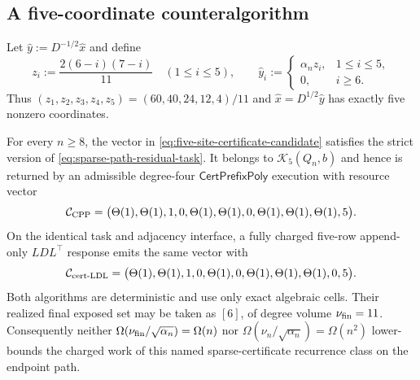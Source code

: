 \subsection{A five-coordinate counteralgorithm}

Let $\widehat y:=D^{-1/2}\widehat x$ and define
\begin{equation}
 z_i:=\frac{2(6-i)(7-i)}{11}
 \quad(1\leq i\leq5),
 \qquad
 \widehat y_i:=
 \begin{cases}
  \alpha_n z_i,&1\leq i\leq5,\\
  0,&i\geq6.
 \end{cases}
 \label{eq:five-site-certificate-candidate}
\end{equation}
Thus
$(z_1,z_2,z_3,z_4,z_5)=(60,40,24,12,4)/11$ and
$\widehat x=D^{1/2}\widehat y$ has exactly five nonzero coordinates.

\begin{theorem}
\label{thm:five-site-supported-prefix-counteralgorithm}
For every $n\geq8$, the vector in
\cref{eq:five-site-certificate-candidate} satisfies the strict version of
\cref{eq:sparse-path-residual-task}.  It belongs to
$\mathcal K_5(Q_n,b)$ and hence is returned by an admissible degree-four
$\mathsf{CertPrefixPoly}$ execution with resource vector
\begin{equation}
 \mathcal C_{\rm CPP}=\bigl(
 \Theta(1),\Theta(1),1,0,\Theta(1),\Theta(1),0,
 \Theta(1),\Theta(1),\Theta(1),5\bigr).
 \label{eq:certificate-prefix-poly-resource-vector}
\end{equation}
On the identical task and adjacency interface, a fully charged five-row
append-only $LDL^\top$ response emits the same vector with
\begin{equation}
 \mathcal C_{\rm cert\text{-}LDL}=\bigl(
 \Theta(1),\Theta(1),1,0,\Theta(1),0,\Theta(1),
 \Theta(1),\Theta(1),0,5\bigr).
 \label{eq:certificate-path-response-resource-vector}
\end{equation}
Both algorithms are deterministic and use only exact algebraic cells.
Their realized final exposed set may be taken as $[6]$, of degree volume
$\nu_{\rm fin}=11$.  Consequently neither
$\Omega(\nu_{\rm fin}/\sqrt{\alpha_n})=\Omega(n)$ nor
$\Omega(\nu_n/\sqrt{\alpha_n})=\Omega(n^2)$ lower-bounds the charged work of
this named sparse-certificate recurrence class on the endpoint path.
\end{theorem}

